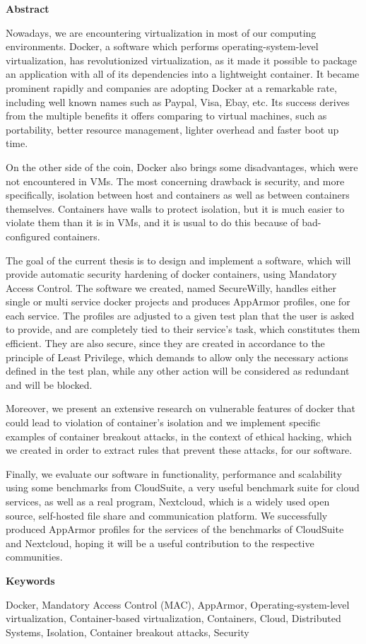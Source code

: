 \hfill\break
\begingroup
\Large{\textbf{Abstract}}
\endgroup
\hfill\break

Nowadays, we are encountering virtualization in most of our computing environments. Docker, a software which performs operating-system-level virtualization, has revolutionized virtualization, as it made it possible to package an application with all of its dependencies into a lightweight container. It became prominent rapidly and companies are adopting Docker at a remarkable rate, including well known names such as Paypal, Visa, Ebay, etc. Its success derives from the multiple benefits it offers comparing to virtual machines, such as portability, better resource management, lighter overhead and faster boot up time. 

On the other side of the coin, Docker also brings some disadvantages, which were not encountered in VMs. The most concerning drawback is security, and more specifically, isolation between host and containers as well as between containers themselves. Containers have walls to protect isolation, but it is much easier to violate them than it is in VMs, and it is usual to do this because of bad-configured containers.

The goal of the current thesis is to design and implement a software, which will provide automatic security hardening of docker containers, using Mandatory Access Control. The software we created, named SecureWilly, handles either single or multi service docker projects and produces AppArmor profiles, one for each service. The profiles are adjusted to a given test plan that the user is asked to provide, and are completely tied to their service's task, which constitutes them efficient. They are also secure, since they are created in accordance to the principle of Least Privilege, which demands to allow only the necessary actions defined in the test plan, while any other action will be considered as redundant and will be blocked.

Moreover, we present an extensive research on vulnerable features of docker that could lead to violation of container's isolation and we implement specific examples of container breakout attacks, in the context of ethical hacking, which we created in order to extract rules that prevent these attacks, for our software.

Finally, we evaluate our software in functionality, performance and scalability using some benchmarks from CloudSuite, a very useful benchmark suite for cloud services, as well as a real program, Nextcloud, which is a widely used open source, self-hosted file share and communication platform. We successfully produced AppArmor profiles for the services of the benchmarks of CloudSuite and Nextcloud, hoping it will be a useful contribution to the respective communities.

\hfill\break
\begingroup
\Large{\textbf{Keywords}}
\endgroup

\hfill\break
Docker, Mandatory Access Control (MAC), AppArmor, Operating-system-level virtualization, Container-based virtualization, Containers, Cloud, Distributed Systems, Isolation, Container breakout attacks, Security

